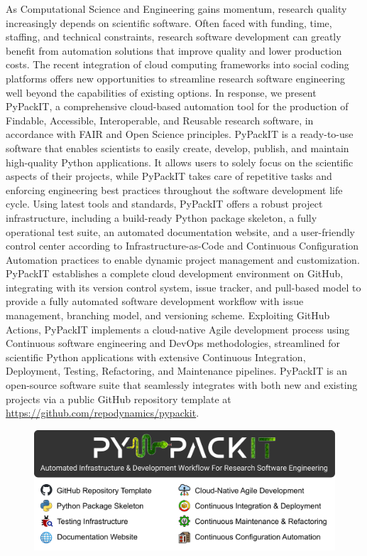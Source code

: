 \documentclass{article}
\begin{document}
As Computational Science and Engineering gains momentum, research quality increasingly depends on scientific software. Often faced with funding, time, staffing, and technical constraints, research software development can greatly benefit from automation solutions that improve quality and lower production costs. The recent integration of cloud computing frameworks into social coding platforms offers new opportunities to streamline research software engineering well beyond the capabilities of existing options. In response, we present PyPackIT, a comprehensive cloud-based automation tool for the production of Findable, Accessible, Interoperable, and Reusable research software, in accordance with FAIR and Open Science principles. PyPackIT is a ready-to-use software that enables scientists to easily create, develop, publish, and maintain high-quality Python applications. It allows users to solely focus on the scientific aspects of their projects, while PyPackIT takes care of repetitive tasks and enforcing engineering best practices throughout the software development life cycle. Using latest tools and standards, PyPackIT offers a robust project infrastructure, including a build-ready Python package skeleton, a fully operational test suite, an automated documentation website, and a user-friendly control center according to Infrastructure-as-Code and Continuous Configuration Automation practices to enable dynamic project management and customization. PyPackIT establishes a complete cloud development environment on GitHub, integrating with its version control system, issue tracker, and pull-based model to provide a fully automated software development workflow with issue management, branching model, and versioning scheme. Exploiting GitHub Actions, PyPackIT implements a cloud-native Agile development process using Continuous software engineering and DevOps methodologies, streamlined for scientific Python applications with extensive Continuous Integration, Deployment, Testing, Refactoring, and Maintenance pipelines. PyPackIT is an open-source software suite that seamlessly integrates with both new and existing projects via a public GitHub repository template at \url{https://github.com/repodynamics/pypackit}.

\begin{figure}
    \centering
    \includegraphics[width=1\linewidth]{graphical_abstract.pdf}
\end{figure}
\end{document}
